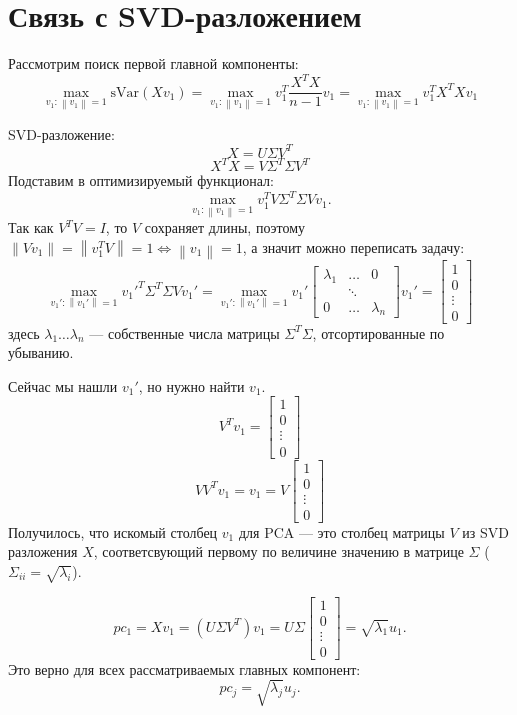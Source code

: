 \documentclass[12pt]{article} %
\theoremstyle{definition} %
\begin{document}
\section{Связь с SVD-разложением}
Рассмотрим поиск первой главной компоненты:
$$\max_{v_1: \left\| v_1 \right\| = 1} \text{sVar}(Xv_1)
= \max_{v_1: \left\| v_1 \right\| = 1} v_1^T \frac{X^TX}{n-1} v_1 =
\max_{v_1: \left\| v_1 \right\| = 1} v_1^T X^TX v_1 $$

SVD-разложение:
$$X = U\Sigma V^T$$
$$X^TX = V \Sigma^T \Sigma V^T$$
Подставим в оптимизируемый функционал:
$$ \max_{v_1: \left\| v_1 \right\| = 1} v_1^T V \Sigma^T \Sigma V v_1.$$
Так как $V^TV=I$, то $V$ сохраняет длины, поэтому
$\left\| Vv_1 \right\| = \left\| v_1^T V \right\| = 1 \iff \left\| v_1 \right\|=1$, а значит можно переписать задачу:
$$ \max_{v_1': \left\| v_1' \right\| = 1} v_1'^T \Sigma^T \Sigma V v_1'
=
\max_{v_1': \left\| v_1' \right\| = 1}
v_1'
\begin{bmatrix}
\lambda_1 & \dots & 0\\
& \ddots &\\
0 & \dots & \lambda_n
\end{bmatrix} v_1' =
\begin{bmatrix}
1\\
0\\
\vdots\\
0
\end{bmatrix}$$
здесь $\lambda_1 \dots \lambda_n$  —  собственные числа матрицы $\Sigma^T\Sigma$,
отсортированные по убыванию.

Сейчас мы нашли $v_1'$, но нужно найти $v_1$.
$$V^Tv_1 =
\begin{bmatrix}
1\\
0\\
\vdots\\
0
\end{bmatrix}$$
$$VV^Tv_1 = v_1 = V
\begin{bmatrix}
1\\
0\\
\vdots\\
0
\end{bmatrix}$$
Получилось, что искомый столбец $v_1$ для PCA  —  это столбец матрицы $V$ из SVD разложения $X$, соответсвующий первому по величине значению в матрице $\Sigma$ ($\Sigma_{ii} = \sqrt{\lambda_i}$).

$$
pc_1 = Xv_1 = (U\Sigma V^T)v_1 =
U \Sigma
\begin{bmatrix}
1\\
0\\
\vdots\\
0
\end{bmatrix}=
\sqrt{\lambda_1}u_1.
$$
Это верно для всех рассматриваемых главных компонент:
$$pc_j = \sqrt{\lambda_j} u_j.$$
\end{document}
